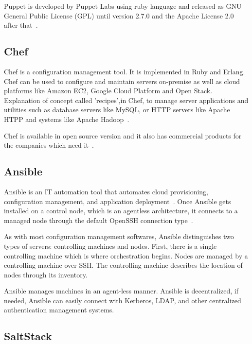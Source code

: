 Puppet is developed by Puppet Labs using ruby language and released as
GNU General Public License (GPL) until version 2.7.0 and the Apache
License 2.0 after that~\cite{www-puppet-wiki-puppet}.

     \pv
	
\subsection{Chef}

Chef is a configuration management tool. It is implemented in Ruby and
Erlang. Chef can be used to configure and maintain servers on-premise
as well as cloud platforms like Amazon EC2, Google Cloud Platform and
Open Stack. Explanation of concept called 'recipes',in Chef, to
manage server applications and utilities such as database servers like
MySQL, or HTTP servers like Apache HTPP and systems like Apache
Hadoop~\cite{chef-book}.

Chef is available in open source version and it also has commercial
products for the companies which need it~\cite{www-chef-commercial}.

     \pv

\subsection{Ansible}

Ansible is an IT automation tool that automates cloud provisioning,
configuration management, and application
deployment~\cite{www-ansible}. Once Ansible gets installed on a
control node, which is an agentless architecture, it connects to a
managed node through the default OpenSSH connection
type~\cite{www-ansible-wikipedia}.

     As with most configuration management softwares, Ansible
     distinguishes two types of servers: controlling machines and
     nodes. First, there is a single controlling machine which is
     where orchestration begins. Nodes are managed by a controlling
     machine over SSH. The controlling machine describes the location
     of nodes through its inventory.

     Ansible manages machines in an agent-less manner. Ansible is
     decentralized, if needed, Ansible can easily connect with
     Kerberos, LDAP, and other centralized authentication management
     systems.

     \pv

\subsection{SaltStack}

